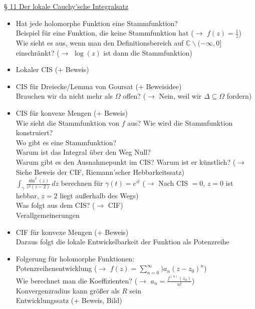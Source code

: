 \documentclass[11pt]{article}
\newcommand{\C}{\mathbb{C}}
\begin{document}
\underline{§ 11 Der lokale Cauchy'sche Integralsatz}
\vspace{-0.5cm}
\begin{itemize}
\item Hat jede holomorphe Funktion eine Stammfunktion? \\
\quad Beispiel für eine Funktion, die keine Stammfunktion hat ($\rightarrow$ $f(z) = \frac{1}{z}$) \\
\quad Wie sieht es aus, wenn man den Definitionsbereich auf $\C \backslash (-\infty,0]$ einschränkt? ($\rightarrow$ $\log(z)$ ist dann die Stammfunktion)
\item Lokaler CIS (+ Beweis)
\item CIS für Dreiecke/Lemma von Goursat (+ Beweisidee) \\
\quad Brauchen wir da nicht mehr als $\Omega$ offen? ($\rightarrow$ Nein, weil wir $\Delta \subseteq \Omega$ fordern)
\item CIS für konvexe Mengen (+ Beweis)\\
\quad Wie sieht die Stammfunktion von $f$ aus? Wie wird die Stammfunktion konstruiert?  \\
\quad Wo gibt es eine Stammfunktion? \\
\quad Warum ist das Integral über den Weg Null? \\
\quad Warum gibt es den Ausnahmepunkt im CIS? Warum ist er künstlich? ($\rightarrow$ Siehe Beweis der CIF, Riemann'scher Hebbarkeitssatz) \\
\quad $\int_{\gamma} \frac{\sin^2(z)}{z^2 (z-2)} \, dz$ berechnen für $\gamma(t) = e^{it}$ ($\rightarrow$ Nach CIS $=0$, $z=0$ ist hebbar, $z=2$ liegt außerhalb des Wegs) \\
\quad Was folgt aus dem CIS? ($\rightarrow$ CIF) \\
\quad Verallgemeinerungen
\item CIF für konvexe Mengen (+ Beweis) \\
\quad Daraus folgt die lokale Entwickelbarkeit der Funktion als Potenzreihe
\item Folgerung für holomorphe Funktionen: \\
\quad Potenzreihenentwicklung ($\rightarrow$ $f(z) = \sum_{n=0}^{\infty}) a_n (z-z_0)^n$) \\
\quad Wie berechnet man die Koeffizienten? ($\rightarrow$ $a_n = \frac{f^{(n)}(z_0)}{n!}$)\\
\quad Konvergenzradius kann größer als $R$ sein \\
\quad Entwicklungssatz (+ Beweis, Bild)\\

\end{itemize}
\end{document}
